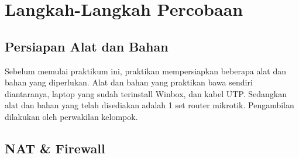 \section{Langkah-Langkah Percobaan}
\subsection{Persiapan Alat dan Bahan}
Sebelum memulai praktikum ini, praktikan mempersiapkan beberapa alat dan bahan yang diperlukan. Alat dan bahan yang praktikan bawa sendiri diantaranya, laptop yang sudah terinstall Winbox, dan kabel UTP. Sedangkan alat dan bahan yang telah disediakan adalah 1 set router mikrotik. Pengambilan dilakukan oleh perwakilan kelompok.

\subsection{NAT \& Firewall}
